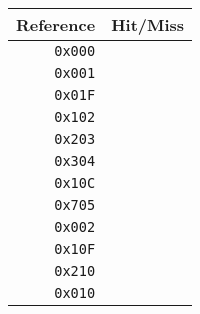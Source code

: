 \newpage

\begin{question}

\end{question}


\newpage
{}

\begin{question}

\end{question}

\begin{question}

\end{question}

\newpage

\begin{question}

\begin{center}
\begin{tabular}{|r|c|}
\hline
Reference & Hit/Miss \\
\hline
\texttt{0x000} &     \\ \hline
\texttt{0x001} &     \\ \hline
\texttt{0x01F} &     \\ \hline
\texttt{0x102} &     \\ \hline
\texttt{0x203} &     \\ \hline
\texttt{0x304} &     \\ \hline
\texttt{0x10C} &     \\ \hline
\texttt{0x705} &     \\ \hline
\texttt{0x002} &     \\ \hline
\texttt{0x10F} &     \\ \hline
\texttt{0x210} &     \\ \hline
\texttt{0x010} &     \\ \hline
\end{tabular}
\end{center}
\end{question}

\newpage

